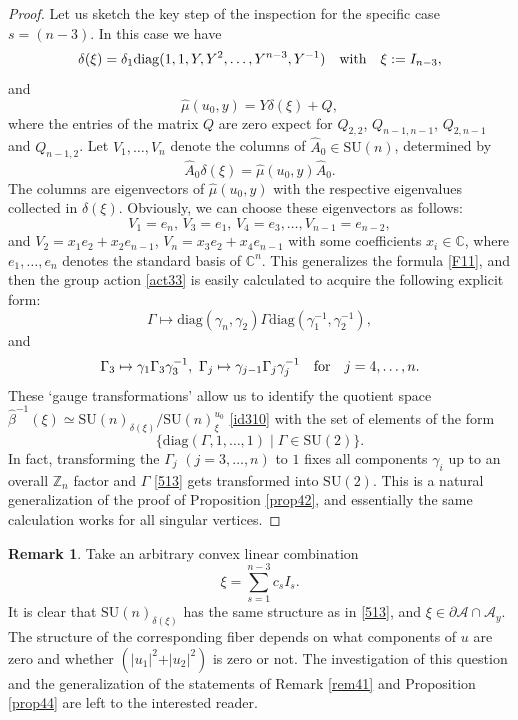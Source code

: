 \documentclass[a4paper,11pt,reqno]{amsart}
\theoremstyle{definition}
\newtheorem{rem}[thm]{Remark}
\numberwithin{equation}{section}
\newcommand{\be}{\begin{equation}}
\newcommand{\ee}{\end{equation}}
\def\cA{{\mathcal A}}                       %
\def\bC{{\mathbb C}}                        %
\def\bZ{{\mathbb Z}}                        %
\def\diag{\mathrm{diag}}                    %
\def\SU{\mathrm{SU}}                        %
\begin{document}
\begin{proof}
Let us sketch the key step of the inspection for the specific case $s= (n-3)$.
In this case we have
\be
\delta(\xi) = \delta_1 \diag(1,1, Y, Y^2,\dots, Y^{n-3}, Y^{-1})\quad  \hbox{with}\quad  \xi:= I_{n-3},
\label{516}\ee
and
\be
\hat \mu(u_0, y) = Y \delta(\xi) + Q,
\label{517}\ee
where the entries of the matrix $Q$ are zero expect for $Q_{2,2}$, $Q_{n-1,n-1}$, $Q_{2,n-1}$ and $Q_{n-1,2}$.
Let $V_1,\dots, V_n$ denote the columns of $\hat A_0\in \SU(n)$, determined by
\be
\hat A_0 \delta(\xi) = \hat \mu(u_0, y) \hat A_0.
\label{518}\ee
The columns are eigenvectors of $\hat \mu(u_0, y)$ with the respective eigenvalues collected in $\delta(\xi)$.
Obviously, we can choose these eigenvectors as follows:
\be
V_1 = e_n,\, V_3= e_1,\, V_4 = e_3,\dots, V_{n-1}= e _{n-2},
\label{519}\ee
and $V_2 = x_1 e_2 + x_2 e_{n-1}$, $V_n = x_3 e_2 + x_4 e_{n-1}$   with some coefficients $x_i\in \bC$, where
$e_1, \dots, e_n$ denotes the standard basis of $\bC^n$. This generalizes the formula \eqref{F11},
and then the group action \eqref{act33}  is easily calculated to acquire  the following explicit form:
\be
\Gamma \mapsto \diag(\gamma_n, \gamma_2) \Gamma \diag(\gamma_1^{-1}, \gamma_2^{-1}),
\label{520}\ee
and
\be
\Gamma_3 \mapsto \gamma_1 \Gamma_3 \gamma_3^{-1},\,\, \Gamma_j \mapsto \gamma_{j-1} \Gamma_j \gamma_j^{-1}
\quad \hbox{for}\quad j=4,\dots, n.
\label{521}\ee
These `gauge transformations' allow us to identify the quotient space
$\hat \beta^{-1}(\xi) \simeq \SU(n)_{\delta(\xi)}/\SU(n)_\xi^{u_0}$
\eqref{id310} with the set of elements of the form
\be
\{\diag(\Gamma, 1,\dots, 1) \mid \Gamma \in \SU(2)\}.
\label{522}\ee
In fact, transforming the $\Gamma_j$ $(j=3,\dots, n)$ to $1$ fixes all components $\gamma_i$ up to an overall $\bZ_n$ factor
and $\Gamma$  \eqref{513} gets transformed into $\SU(2)$.
This is a natural generalization of the proof of Proposition \ref{prop42},
and essentially the same calculation works  for all singular vertices.
\end{proof}

\begin{rem}\label{remgenI}
Take an arbitrary convex linear combination
\be
\xi = \sum_{s=1}^{n-3} c_s I_s.
\label{523}\ee
It is clear that $\SU(n)_{\delta(\xi)}$ has the same structure as in \eqref{513}, and $\xi \in \partial \cA \cap \cA_y$.
The structure of the corresponding fiber depends on what components of $u$  are zero and whether
$(\vert u_1 \vert^2 + \vert u_2 \vert^2)$ is  zero or not.
 The investigation of this question and the generalization of the statements of Remark \ref{rem41} and Proposition \ref{prop44}
are left to the interested reader.
\end{rem}
\end{document}
